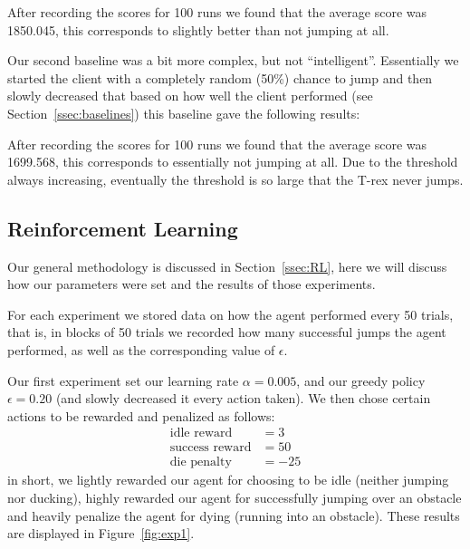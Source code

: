 \documentclass{scrartcl}
\begin{document}
    After recording the scores for 100 runs we found that the average score was
    1850.045, this corresponds to slightly better than not jumping at all.

    Our second baseline was a bit more complex, but not ``intelligent''.
    Essentially we started the client with a completely random (50\%) chance to
    jump and then slowly decreased that based on how well the client performed
    (see Section~\ref{ssec:baselines}) this baseline gave the following results:

    After recording the scores for 100 runs we found that the average score was
    1699.568, this corresponds to essentially not jumping at all. Due to the
    threshold always increasing, eventually the threshold is so large that the
    T-rex never jumps.

    \subsection{Reinforcement Learning}
    Our general methodology is discussed in Section~\ref{ssec:RL}, here we will
    discuss how our parameters were set and the results of those experiments.

    For each experiment we stored data on how the agent performed every 50
    trials, that is, in blocks of 50 trials we recorded how many successful
    jumps the agent performed, as well as the corresponding value of
    $\epsilon$.

    Our first experiment set our learning rate $\alpha = 0.005$, and our
    greedy policy $\epsilon = 0.20$ (and slowly decreased it every action
    taken). We then chose certain actions to be rewarded and penalized as
    follows:
    \begin{align*}
        \text{idle reward} &= 3\\
        \text{success reward} &= 50\\
        \text{die penalty} & = -25
    \end{align*}
    in short, we lightly rewarded our agent for choosing to be idle (neither
    jumping nor ducking), highly rewarded our agent for successfully jumping
    over an obstacle and heavily penalize the agent for dying (running into an
    obstacle). These results are displayed in Figure~\ref{fig:exp1}.
\end{document}
